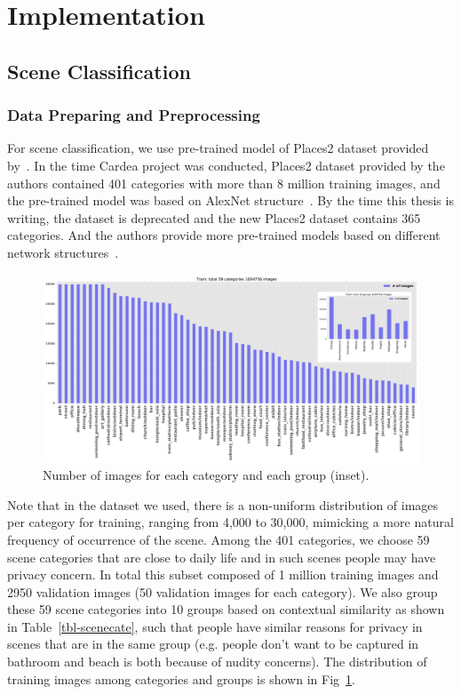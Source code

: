 \section{Implementation}

\subsection{Scene Classification}

\subsubsection{Data Preparing and Preprocessing}

For scene classification, we use pre-trained model of Places2 dataset provided by~\cite{links:places2mit}. In the time Cardea project was conducted, Places2 dataset provided by the authors contained 401 categories with more than 8 million training images, and the pre-trained model was based on AlexNet structure~\cite{krizhevsky2012imagenet}. By the time this thesis is writing, the dataset is deprecated and the new Places2 dataset contains 365 categories. And the authors provide more pre-trained models based on different network structures~\cite{links:places2pre}.

\begin{figure}[!htbp]
    \centering
    \includegraphics[width=1.0\textwidth]{figure/ch4-numdist.pdf}
    \caption{Number of images for each category and each group (inset).}
    \label{fig:ch4-scenenumdist}
\end{figure}

Note that in the dataset we used, there is a non-uniform distribution of images per category for training, ranging from 4,000 to 30,000, mimicking a more natural frequency of occurrence of the scene. Among the 401 categories, we choose 59 scene categories that are close to daily life and in such scenes people may have privacy concern. In total this subset composed of 1 million training images and 2950 validation images (50 validation images for each category). We also group these 59 scene categories into 10 groups based on contextual similarity as shown in Table~\ref{tbl-scenecate}, such that people have similar reasons for privacy in scenes that are in the same group (e.g. people don't want to be captured in bathroom and beach is both because of nudity concerns). The distribution of training images among categories and groups is shown in Fig~\ref{fig:ch4-scenenumdist}.

